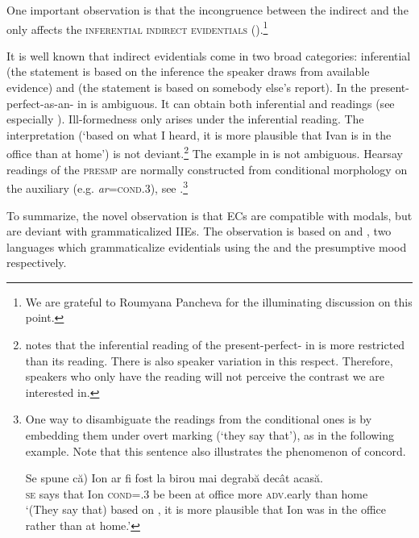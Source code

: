 \documentclass[output=paper,colorlinks,citecolor=brown,newtxmath]{langsci/langscibook}
\begin{document}
\noindent One important observation is that the incongruence between  the indirect  and the  only affects the \textsc{inferential indirect evidentials} ().\footnote{We are grateful to Roumyana Pancheva for the illuminating discussion on this point.}

It is well known that indirect evidentials come in two broad categories: inferential (the statement is based on the inference the speaker draws from available evidence) and  (the statement is based on somebody else's report). In  the present-perfect-as-an- in  is ambiguous. It can obtain both inferential and  readings (see especially \citealt{smir13,koev17}). Ill-formedness only arises under the inferential reading. The  interpretation (`based on what I heard, it is more plausible that Ivan is in the office than at home') is not deviant.\footnote{\cite[fn. 2]{koev17} notes that the inferential reading of the present-perfect- in  is more restricted than its  reading. There is also speaker variation in this respect. Therefore, speakers who only have the  reading will not perceive the contrast we are interested in.}
The  example in  is not ambiguous. Hearsay readings of the \textsc{presmp} are normally constructed from conditional morphology on the auxiliary (e.g. \textit{ar}=\textsc{cond.3}), see \citet{iri18}.\footnote{One way to disambiguate the  readings from the conditional ones is by embedding them under overt  marking (`they say that'), as in the following example. Note that this sentence also illustrates the phenomenon of  concord.

	\ea \gll \minsp{(} Se spune că) Ion ar fi fost la birou mai degrabă decât acasă.\\
	{} \textsc{se} says that Ion \textsc{cond=.3} be been at office more \textsc{adv}.early	than	home\\
	\glt `(They say that) based on , it is more plausible that Ion was in the office rather than at home.'\z
}

 To summarize, the novel observation is that ECs are compatible with  modals, but are deviant with grammaticalized IIEs. The observation is based on  and , two languages which grammaticalize evidentials using the  and the presumptive mood respectively.
\end{document}
